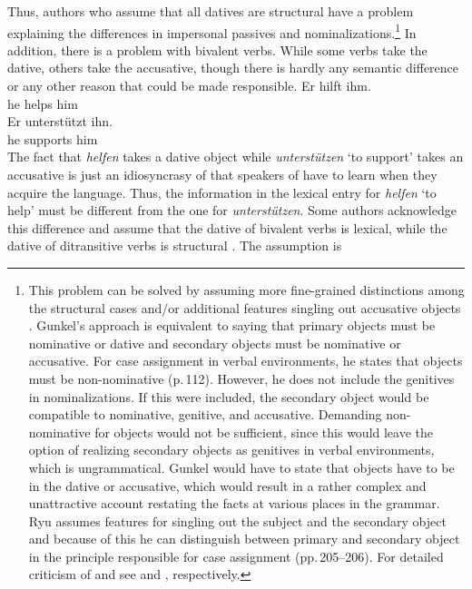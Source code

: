 \noindent
Thus, authors who assume that all datives are structural have a problem explaining the differences in
impersonal passives and nominalizations.\footnote{\label{fn-structural-dative}
  This problem can be solved by assuming more fine-grained distinctions among the structural cases
  \citep[]{Gunkel2003b} and/or additional features singling out accusative objects
  \citep[]{Ryu97a}. Gunkel's approach is equivalent to saying that primary objects must be nominative
  or dative and secondary objects must be nominative or accusative. For case assignment in verbal
  environments, he states that objects must be non-nominative (p.\,112). However, he does not include the
  genitives in nominalizations. If this were included, the secondary object would be compatible to
  nominative, genitive, and accusative. Demanding non-nominative for objects would not be
  sufficient, since this would leave the option of realizing secondary objects as genitives in
  verbal environments, which is ungrammatical. Gunkel would have to state that objects have to
  be in the dative or accusative, which would result in a rather complex and unattractive
  account restating the facts at various places in the grammar. Ryu assumes features for singling
  out the subject and the secondary object and because of this he can distinguish between primary
  and secondary object in the principle responsible for case assignment (pp.\,205--206). For
  detailed criticism of  and  see 
  and , respectively.  
} In addition, there is a problem with bivalent verbs. While
some verbs take the dative, others take the accusative, though there is hardly any semantic
difference or any other reason that could be made responsible.
\eal
\ex 
\gll Er hilft ihm.\\
     he helps him\\
\ex 
\gll Er unterstützt ihn.\\
     he supports him\\
\zl
The fact that \emph{helfen} takes a dative object while \emph{unterstützen} `to support' takes an accusative is
just an idiosyncrasy of  that speakers of  have to learn when they acquire the
language. Thus, the information in the lexical entry for \emph{helfen} `to help' must be different from the one
for \emph{unterstützen}. Some authors acknowledge this difference and assume that the dative of
bivalent verbs is lexical, while the dative of ditransitive verbs is structural \citep[, 51]{Wunderlich97a}. The assumption is
